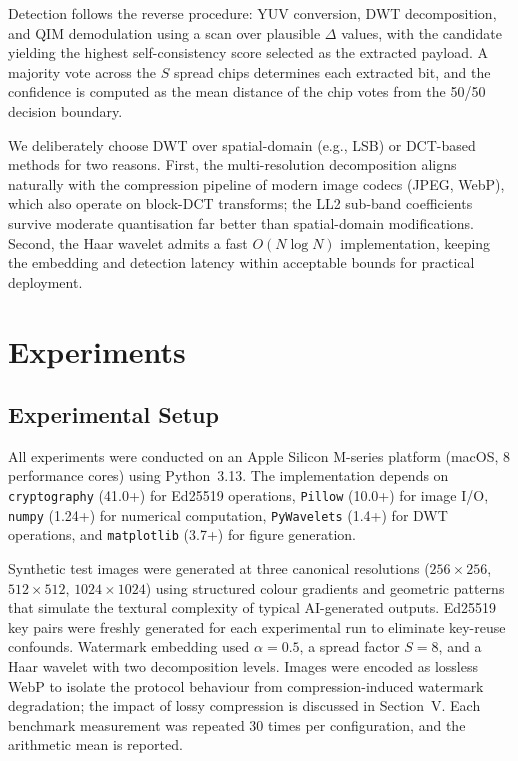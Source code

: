 \documentclass[conference]{IEEEtran}
\begin{document}
Detection follows the reverse procedure: YUV conversion, DWT
decomposition, and QIM demodulation using a scan over plausible
$\Delta$ values, with the candidate yielding the highest
self-consistency score selected as the extracted payload.
A majority vote across the $S$ spread chips determines each extracted
bit, and the confidence is computed as the mean distance of the chip
votes from the 50/50 decision boundary.

We deliberately choose DWT over spatial-domain (e.g., LSB) or DCT-based
methods for two reasons.
First, the multi-resolution decomposition aligns naturally with the
compression pipeline of modern image codecs (JPEG, WebP), which also
operate on block-DCT transforms; the LL2 sub-band coefficients survive
moderate quantisation far better than spatial-domain modifications.
Second, the Haar wavelet admits a fast $O(N \log N)$ implementation,
keeping the embedding and detection latency within acceptable bounds for
practical deployment.

\section{Experiments}

\subsection{Experimental Setup}

All experiments were conducted on an Apple Silicon M-series platform
(macOS, 8 performance cores) using Python~3.13.
The implementation depends on \texttt{cryptography} (41.0+) for Ed25519
operations, \texttt{Pillow} (10.0+) for image I/O, \texttt{numpy} (1.24+)
for numerical computation, \texttt{PyWavelets} (1.4+) for DWT operations,
and \texttt{matplotlib} (3.7+) for figure generation.

Synthetic test images were generated at three canonical resolutions
($256{\times}256$, $512{\times}512$, $1024{\times}1024$) using structured
colour gradients and geometric patterns that simulate the textural
complexity of typical AI-generated outputs.
Ed25519 key pairs were freshly generated for each experimental run to
eliminate key-reuse confounds.
Watermark embedding used $\alpha = 0.5$, a spread factor $S = 8$, and a
Haar wavelet with two decomposition levels.
Images were encoded as lossless WebP to isolate the protocol behaviour
from compression-induced watermark degradation; the impact of lossy
compression is discussed in Section~V.
Each benchmark measurement was repeated 30 times per configuration, and
the arithmetic mean is reported.
\end{document}
